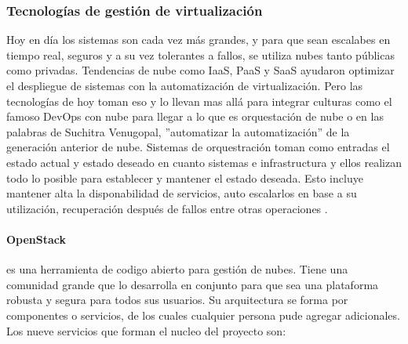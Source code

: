 \subsubsection{Tecnologías de gestión de virtualización}
Hoy en día los sistemas son cada vez más grandes, y para que sean escalabes en tiempo real, seguros y a su vez tolerantes a fallos, se utiliza nubes tanto públicas como privadas. Tendencias de nube como IaaS, PaaS y SaaS ayudaron optimizar el despliegue de sistemas con la automatización de virtualización. Pero las tecnologías de hoy toman eso y lo llevan mas allá para integrar culturas como el famoso DevOps con nube para llegar a lo que es orquestación de nube o en las palabras de Suchitra Venugopal, ''automatizar la automatización'' de la generación anterior de nube. Sistemas de orquestración toman como entradas el estado actual y estado deseado en cuanto sistemas e infrastructura y ellos realizan todo lo posible para establecer y mantener el estado deseada. Esto incluye mantener alta la disponabilidad de servicios, auto escalarlos en base a su utilización, recuperación después de fallos entre otras operaciones \citep{IBM-Cloud-Orchestration}.

\paragraph{OpenStack}
es una herramienta de codigo abierto para gestión de nubes. Tiene una comunidad grande que lo desarrolla en conjunto para que sea una plataforma robusta y segura para todos sus usuarios. Su arquitectura se forma por componentes o servicios, de los cuales cualquier persona pude agregar adicionales. Los nueve servicios que forman el nucleo del proyecto son:

